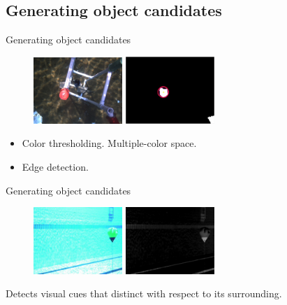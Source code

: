 \documentclass{beamer}
\begin{document}
\subsection{Generating object candidates}
\begin{frame}{Generating object candidates}
        \begin{figure}[ht]
        \centering
            \includegraphics[width=0.3\textwidth, height=0.3\textheight]{figs/redcoin.png}\hspace{5em}
            \includegraphics[width=0.3\textwidth, height=0.3\textheight]{figs/redcoin_blob.png}
    \end{figure}
    \begin{itemize}
        \item Color thresholding. Multiple-color space.
        \item Edge detection.
    \end{itemize}
\end{frame}

\begin{frame}{Generating object candidates}
    \begin{figure}[ht]
        \centering
        \includegraphics[width=0.3\textwidth, height=0.3\textheight]{figs/qt16_buoy_bright_green.png}\hspace{5em}
        \includegraphics[width=0.3\textwidth, height=0.3\textheight]{figs/qt16_buoy_bright_green_saliency.png}
    \end{figure}
    Detects visual cues that distinct with respect to its surrounding.
\end{frame}
\end{document}
